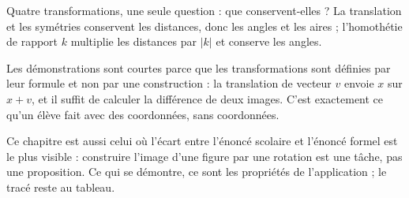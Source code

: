 Quatre transformations, une seule question : que conservent-elles ? La translation et les
symétries conservent les distances, donc les angles et les aires ; l'homothétie de rapport
$k$ multiplie les distances par $|k|$ et conserve les angles.

Les démonstrations sont courtes parce que les transformations sont définies par leur
formule et non par une construction : la translation de vecteur $v$ envoie $x$ sur $x + v$,
et il suffit de calculer la différence de deux images. C'est exactement ce qu'un élève fait
avec des coordonnées, sans coordonnées.

Ce chapitre est aussi celui où l'écart entre l'énoncé scolaire et l'énoncé formel est le
plus visible : \og{} construire l'image d'une figure par une rotation \fg{} est une tâche,
pas une proposition. Ce qui se démontre, ce sont les propriétés de l'application ; le tracé
reste au tableau.
